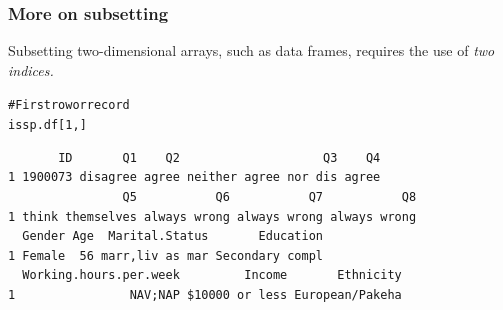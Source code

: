 \documentclass{beamer}\usepackage[]{graphicx}\usepackage[]{color}
\makeatletter
\newcommand{\hlnum}[1]{\textcolor[rgb]{0.533,0,0.133}{#1}}%
\newcommand{\hlcom}[1]{\textcolor[rgb]{1,0.533,0}{#1}}%
\newcommand{\hlopt}[1]{\textcolor[rgb]{0,0,0}{\textbf{#1}}}%
\newcommand{\hlstd}[1]{\textcolor[rgb]{0,0,0}{#1}}%
\newcommand{\hlkwd}[1]{\textcolor[rgb]{0,0.267,0.4}{#1}}%
\newenvironment{kframe}{%
 \def\at@end@of@kframe{}%
 \ifinner\ifhmode%
  \def\at@end@of@kframe{\end{minipage}}%
  \begin{minipage}{\columnwidth}%
 \fi\fi%
 \def\FrameCommand##1{\hskip\@totalleftmargin \hskip-\fboxsep
 \colorbox{shadecolor}{##1}\hskip-\fboxsep
     \hskip-\linewidth \hskip-\@totalleftmargin \hskip\columnwidth}%
 \MakeFramed {\advance\hsize-\width
   \@totalleftmargin\z@ \linewidth\hsize
   \@setminipage}}%
 {\par\unskip\endMakeFramed%
 \at@end@of@kframe}
\newenvironment{knitrout}{}{} %
\makeatother
\begin{document}
\begin{frame}[fragile]
\frametitle{More on subsetting}
Subsetting two-dimensional arrays, such as data frames, requires the use of \em{two} indices.
\begin{knitrout}
\color{fgcolor}\begin{kframe}
\begin{alltt}
\hlcom{#First row or record}
\hlstd{issp.df[}\hlnum{1}\hlstd{, ]}
\end{alltt}
\begin{verbatim}
       ID       Q1    Q2                    Q3    Q4
1 1900073 disagree agree neither agree nor dis agree
                Q5           Q6           Q7           Q8
1 think themselves always wrong always wrong always wrong
  Gender Age  Marital.Status       Education
1 Female  56 marr,liv as mar Secondary compl
  Working.hours.per.week         Income       Ethnicity
1                NAV;NAP $10000 or less European/Pakeha
\end{verbatim}
\end{kframe}
\end{knitrout}
\end{frame}
\end{document}
